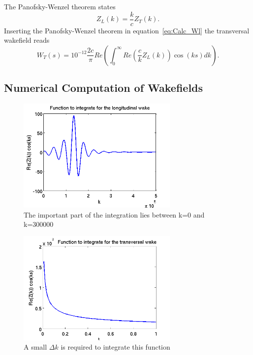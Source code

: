 \documentclass[11pt,a4paper]{article}
\begin{document}
The Panofsky-Wenzel theorem states
\begin{equation}
Z_L(k) = \frac{k}{c}Z_T(k).
\end{equation}
Inserting the Panofsky-Wenzel theorem in equation~\eqref{eq:Calc_Wl} the transversal wakefield reads
\begin{equation} \label{eq:Calc_Wt}
W_T(s)= 10^{-12} \dfrac{2c}{\pi}Re\left(\int_0^\infty Re( \frac{c}{k}Z_L(k))\cos (ks)dk\right).
\end{equation}

\subsection{Numerical Computation of Wakefields}
\begin{figure}[htb]
\begin{center}
\includegraphics[width=0.7\textwidth]{wakeComp/lo_Integration.png}
\caption{The important part of the integration lies between k=0 and k=300000 \label{fig:lo_calc} }
\end{center}
\end{figure}
\begin{figure}[htb]
\begin{center}
\includegraphics[width=0.7\textwidth]{wakeComp/tr_Integration.png}
\caption{A small $\Delta k$ is required to integrate this function \label{fig:tr_calc} }
\end{center}
\end{figure}
\end{document}
